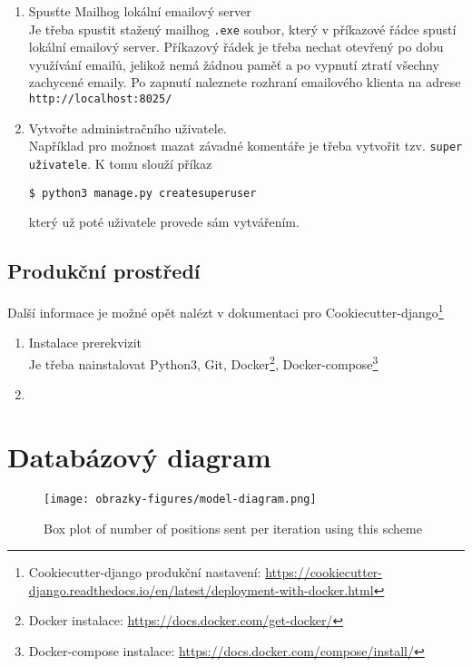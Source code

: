 \begin{enumerate}
    je spuštěn lokální vývojový server spolu s automatickým obnovením stránky při úpravě v HTML šablonách a také automatickou kompilací a doplněním CSS po uložení změn v SASS souboru - v tomto případě bez nutnosti obnovení stránky. Po startu serveru by se mělo automaticky otevřít okno s aplikací. V případě neotevření automaticky by se měla aplikace nacházet na url \url{http://127.0.0.1:8000/}.
    
    \item Spusťte Mailhog lokální emailový server\\
    Je třeba spustit stažený mailhog \texttt{.exe} soubor, který v příkazové řádce spustí lokální emailový server. Příkazový řádek je třeba nechat otevřený po dobu využívání emailů, jelikož nemá žádnou paměť a po vypnutí ztratí všechny zachycené emaily. Po zapnutí naleznete rozhraní emailového klienta na adrese \texttt{http://localhost:8025/}
    
    \item Vytvořte administračního uživatele.\\
    Například pro možnost mazat závadné komentáře je třeba vytvořit tzv. \texttt{super uživatele}. K tomu slouží příkaz

    \texttt{\$ python3 manage.py createsuperuser}

    který už poté uživatele provede sám vytvářením.
    
    
\end{enumerate}




\section{Produkční prostředí}
\label{append:instalace-production}
Další informace je možné opět nalézt v dokumentaci pro Cookiecutter-django\footnote{Cookiecutter-django produkční nastavení: \url{https://cookiecutter-django.readthedocs.io/en/latest/deployment-with-docker.html}}

\begin{enumerate}
    \item Instalace prerekvizit\\
    Je třeba nainstalovat Python3, Git, Docker\footnote{Docker instalace: \url{https://docs.docker.com/get-docker/}}, Docker-compose\footnote{Docker-compose instalace: \url{https://docs.docker.com/compose/install/}}
    
    \item 
\end{enumerate}







\chapter{Databázový diagram}

\begin{sidewaysfigure}
    \centering
    \texttt{[image: obrazky-figures/model-diagram.png]}
    \caption{Box plot of number of positions sent per iteration using this scheme}
    \label{fig:awesome_image}
\end{sidewaysfigure}